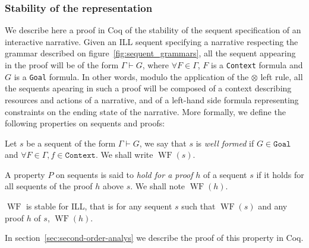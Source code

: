 \documentclass[runningheads,a4paper]{llncs}
\DeclareMathOperator{\wf}{WF}
\begin{document}
\subsubsection{Stability of the representation}

We describe here a proof in Coq of the stability of the sequent specification of an interactive narrative. Given an ILL sequent specifying a narrative respecting the grammar described on figure~\ref{fig:sequent_grammars}, all the sequent appearing in the proof will be of the form $\Gamma\vdash G $, where $\forall F\in\Gamma$, $F$ is a \texttt{Context} formula and $G$ is a \texttt{Goal} formula. In other words, modulo the application of the $\otimes$ left rule, all the sequents apearing in such a proof will be composed of a context describing resources and actions of a narrative, and of a left-hand side formula representing constraints on the ending state of the narrative.
More formally, we define the following properties on sequents and
proofs:
\begin{definition}
  Let $s$ be a sequent of the form $\Gamma\vdash G$, we say that $s$
  is \emph{well formed} if $G\in\texttt{Goal}$ and $\forall
  F\in\Gamma, f \in \texttt{Context}$. We shall write $\wf(s)$.
\end{definition}
\begin{definition}
  A property $P$ on sequents is said to \emph{hold for a proof} $h$ of
  a sequent $s$ if it holds for all sequents of the proof $h$ above
  $s$. We shall note $\wf(h)$.
\end{definition}
\begin{definition}\label{def:stab}
  $\wf$ is stable for ILL, that is for any sequent $s$ such that
  $\wf(s)$ and any proof $h$ of $s$, $\wf(h)$.
\end{definition}
In section~\ref{sec:second-order-analys} we describe the proof of
this property in Coq.
%
\end{document}
